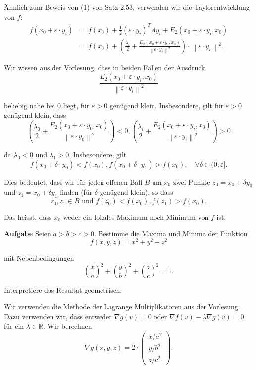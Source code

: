 Ähnlich zum Beweis von (1) von Satz 2.53, verwenden wir die Taylorentwicklung von $f$:
$$
\begin{aligned}
f\left(x_{0}+\varepsilon \cdot y_{i}\right) &=f\left(x_{0}\right)+\frac{1}{2}\left(\varepsilon \cdot y_{i}\right)^{T} A y_{i}+E_{2}\left(x_{0}+\varepsilon \cdot y_{i}, x_{0}\right) \\
&=f\left(x_{0}\right)+\left(\frac{\lambda_{i}}{2}+\frac{E_{2}\left(x_{0}+\varepsilon \cdot y_{i}, x_{0}\right)}{\left\|\varepsilon \cdot y_{i}\right\|^{2}}\right) \cdot\left\|\varepsilon \cdot y_{i}\right\|^{2} .
\end{aligned}
$$

Wir wissen aus der Vorlesung, dass in beiden Fällen der Ausdruck
$$
\frac{E_{2}\left(x_{0}+\varepsilon \cdot y_{i}, x_{0}\right)}{\left\|\varepsilon \cdot y_{i}\right\|^{2}}
$$

beliebig nahe bei 0 liegt, für $\varepsilon>0$ genügend klein. Insbesondere, gilt für $\varepsilon>0$ genügend klein, dass
$$
\left(\frac{\lambda_{0}}{2}+\frac{E_{2}\left(x_{0}+\varepsilon \cdot y_{0}, x_{0}\right)}{\left\|\varepsilon \cdot y_{0}\right\|^{2}}\right)<0,\left(\frac{\lambda_{i}}{2}+\frac{E_{2}\left(x_{0}+\varepsilon \cdot y_{i}, x_{0}\right)}{\left\|\varepsilon \cdot y_{i}\right\|^{2}}\right)>0
$$

da $\lambda_{0}<0$ und $\lambda_{1}>0$. Insbesondere, gilt
$$
f\left(x_{0}+\delta \cdot y_{0}\right)<f\left(x_{0}\right), f\left(x_{0}+\delta \cdot y_{1}\right)>f\left(x_{0}\right), \quad \forall \delta \in(0, \varepsilon] .
$$

Dies bedeutet, dass wir für jeden offenen Ball $B$ um $x_{0}$ zwei Punkte $z_{0}=x_{0}+\delta y_{0}$ und $z_{1}=x_{0}+\delta y_{1}$ finden (für $\delta$ genügend klein), so dass
$$
z_{0}, z_{1} \in B \text { und } f\left(z_{0}\right)<f\left(x_{0}\right), f\left(z_{1}\right)>f\left(x_{0}\right) .
$$

Das heisst, dass $x_{0}$ weder ein lokales Maximum noch Minimum von $f$ ist.

\hrulefill

\textbf{Aufgabe} Seien $a>b>c>0$. Bestimme die Maxima und Minima der Funktion
$$
f(x, y, z)=x^{2}+y^{2}+z^{2}
$$

mit Nebenbedingungen
$$
\left(\frac{x}{a}\right)^{2}+\left(\frac{y}{b}\right)^{2}+\left(\frac{z}{c}\right)^{2}=1 .
$$

Interpretiere das Resultat geometrisch. \smallskip

Wir verwenden die Methode der Lagrange Multiplikatoren aus der Vorlesung. Dazu
verwenden wir, dass entweder $\nabla g(v)=0$ oder $\nabla f(v)-\lambda \nabla g(v)=0$
für ein $\lambda \in \mathbb{R}$. Wir berechnen
$$
\nabla g(x, y, z)=2 \cdot\left(\begin{array}{l}
x / a^2 \\
y / b^2 \\
z / c^2
\end{array}\right) .
$$

